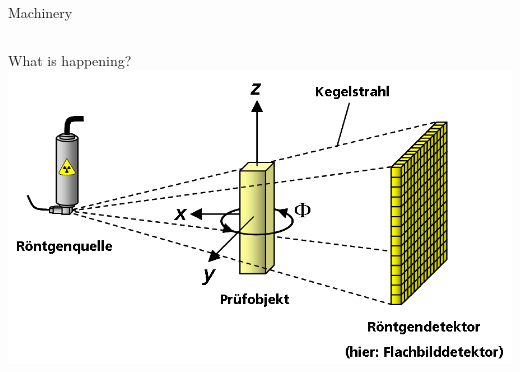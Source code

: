 \begin{frame}{Machinery}
	\begin{columns}
		\begin{column}{0.49\linewidth}
			\centering
			
		\end{column}
		\begin{column}{0.49\linewidth}
			\centering
			\only<1>{}%
			\only<2|handout:0>{}%
			\only<3|handout:0>{}%
		\end{column}
	\end{columns}
\end{frame}

\begin{frame}{What is happening?}
	\centering
	\includegraphics[height=0.618\textheight]{./images/3D_Computed_Tomography}
\end{frame}

